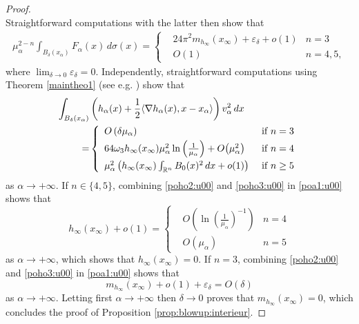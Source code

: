 \documentclass[10pt]{amsart}
\numberwithin{equation}{section}
\newcommand{\ve}{\varepsilon}
\newcommand{\ma}{\mu_\alpha}
\def \rr {\mathbb{R}}
\def \xl{x_\alpha}
\def \ma{\mu_{\alpha}}
\def \va{v_{\alpha}}
\def \ha{h_{\alpha}}
\def \hi{h_{\infty}}
\def \xin{x_{\infty}}
\def \r {\rangle}
\def \l{\langle}
\theoremstyle{plain}
\theoremstyle{remark}
\begin{document}
\begin{proof}
\begin{equation*}
	\end{equation*} 
Straightforward computations with the latter then show that 
\begin{equation} \label{poho2:u00}
\begin{aligned}
\ma^{2-n} \int_{B_{\delta}(x_\alpha)}  F_{\alpha}(x) \,  d\sigma(x) = 
\left \{ 
\begin{aligned}
& 24\pi^2 m_{h_\infty}(x_\infty)  + \ve_\delta + o(1) & n=3 \\
& O(1) & n = 4,5 ,
\end{aligned}
\right. 
\end{aligned}
\end{equation}
where $\lim_{\delta \to 0} \ve_\delta =0$. Independently, straightforward computations using Theorem \ref{maintheo1} (see e.g. \cite[Section 5]{PremoselliRobert}) show that 
\begin{equation}\label{poho3:u00}
	\begin{aligned}
		 \int_{B_{\delta}(\xl)}& \left( \ha(x)+\frac12 \l\nabla \ha(x),x-\xl \r \right)\va^2\, dx \\=	
		& \left\{\begin{array}{ll}
		\vspace{0.1cm}	O\left( \delta \ma\right)  &\hbox{ if } n=3\\
		\vspace{0.1cm}	64 \omega_3 h_\infty(x_\infty)\ma^2\ln\left(\frac{1}{\ma}\right) + O\big( \ma^2 \big)	 &\hbox{ if } n=4\\
			\ma^2\left( \hi(\xin)\int_{\rr^n} B_0(x)^2\, dx+o(1)\right)  &\hbox{ if } n\geq 5
		\end{array}\right.
		\end{aligned} 
	\end{equation}
	as $\alpha \to + \infty$. If $n \in \{4,5\}$, combining  \eqref{poho2:u00} and \eqref{poho3:u00} in \eqref{poa1:u00} shows that 
	$$ h_\infty(x_\infty) + o(1) = \left \{ \begin{aligned} & O\left(\ln \left( \frac{1}{\ma} \right)^{-1} \right) & n=4 \\ & O (\ma) & n = 5 \end{aligned} \right. $$
	as $\alpha \to + \infty$, which shows that $h_\infty(x_\infty) = 0$. If $n=3$, combining  \eqref{poho2:u00} and \eqref{poho3:u00} in \eqref{poa1:u00} shows that 
	$$ m_{h_\infty}(x_\infty) + o(1) + \ve_\delta = O(\delta) $$
	as $\alpha \to + \infty$. Letting first $\alpha \to + \infty$ then $\delta \to 0$ proves that $m_{h_\infty}(x_\infty) = 0$, which concludes the proof of Proposition \ref{prop:blowup:interieur}. 
\end{proof}
\end{document}

